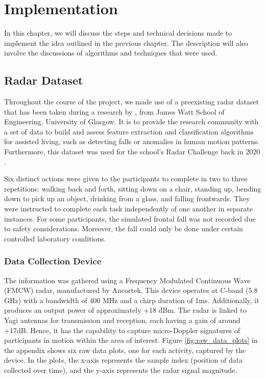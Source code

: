\documentclass{l4proj}
\begin{document}
\chapter{Implementation}
In this chapter, we will discuss the steps and technical decisions made to implement the idea outlined in the previous chapter. The description will also involve the discussions of algorithms and techniques that were used.

\section{Radar Dataset}
Throughout the course of the project, we made use of a preexisting radar dataset that has been taken during a research by \cite{RadarSensingForHealthcare}, from James Watt School of Engineering, University of Glasgow. It is to provide the research community with a set of data to build and assess feature extraction and classification algorithms for assisted living, such as detecting falls or anomalies in human motion patterns. Furthermore, this dataset was used for the school's Radar Challenge back in 2020 \citep{radar_challenge_university_of_glasgow}.

Six distinct actions were given to the participants to complete in two to three repetitions: walking back and forth, sitting down on a chair, standing up, bending down to pick up an object, drinking from a glass, and falling frontwards. They were instructed to complete each task independently of one another in separate instances. For some participants, the simulated frontal fall was not recorded due to safety considerations. Moreover, the fall could only be done under certain controlled laboratory conditions.

\subsection{Data Collection Device}
The information was gathered using a Frequency Modulated Continuous Wave (FMCW) radar, manufactured by Ancortek. This device operates at C-band (5.8 GHz) with a bandwidth of 400 MHz and a chirp duration of 1ms. Additionally, it produces an output power of approximately +18 dBm. The radar is linked to Yagi antennas for transmission and reception, each having a gain of around +17dB. Hence, it has the capability to capture micro-Doppler signatures of participants in motion within the area of interest. Figure \ref{fig:raw_data_plots} in the appendix shows six raw data plots, one for each activity, captured by the device. In the plots, the x-axis represents the sample index (position of data collected over time), and the y-axis represents the radar signal magnitude.
\end{document}
